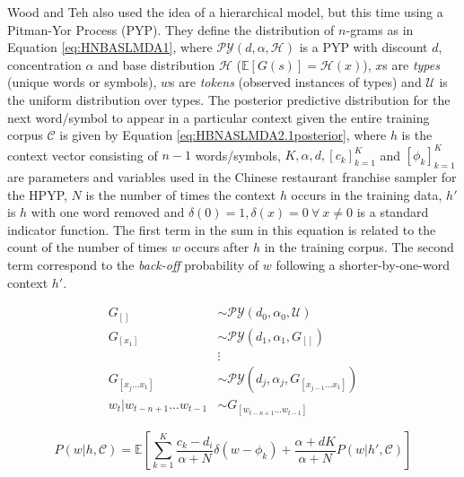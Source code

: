 Wood and Teh \cite{wood2008hierarchical} \cite{wood2009hierarchical} also used the idea of a hierarchical model, but this time using a Pitman-Yor Process (PYP). They define the distribution of $n$-grams as in Equation \ref{eq:HNBASLMDA1}, where $\mathcal{PY}(d,\alpha,\mathcal{H})$ is a PYP with discount $d$, concentration $\alpha$ and base distribution $\mathcal{H}$ ($\mathbb{E}[G(s)]=\mathcal{H}(x)$), $x$s are \textit{types} (unique words or symbols), $w$s are \textit{tokens} (observed instances of types) and $\mathcal{U}$ is the uniform distribution over types. The posterior predictive distribution for the next word/symbol to appear in a particular context given the entire training corpus $\mathcal{C}$ is given by Equation \ref{eq:HBNASLMDA2.1posterior}, where $h$ is the context vector consisting of $n-1$ words/symbols, $K,\alpha,d,[c_{k}]_{k=1}^{K}$ and $[\phi_{k}]_{k=1}^{K}$ are parameters and variables used in the Chinese restaurant franchise sampler for the HPYP, $N$ is the number of times the context $h$ occurs in the training data, $h'$ is $h$ with one word removed and $\delta(0)=1,\delta(x)=0\ \forall\ x\neq0$ is a standard indicator function. The first term in the sum in this equation is related to the count of the number of times $w$ occurs after $h$ in the training corpus. The second term correspond to the \textit{back-off} probability of $w$ following a shorter-by-one-word context $h'$.

\begin{subequations}
\begin{align}
G_{[]}&\sim\mathcal{PY}(d_{0},\alpha_{0},\mathcal{U})
\\
G_{[x_{1}]}&\sim\mathcal{PY}(d_{1},\alpha_{1},G_{[]})
\\
&\vdots\nonumber
\\
G_{[x_{j}...x_{1}]}&\sim\mathcal{PY}(d_{j},\alpha_{j},G_{[x_{j-1}...x_{1}]})
\\
w_{t}|w_{t-n+1}...w_{t-1}&\sim G_{[w_{t-n+1}...w_{t-1}]}
\end{align}
\label{eq:HNBASLMDA1}
\end{subequations}

\begin{equation}
P(w|h,\mathcal{C})=\mathbb{E}\left[\sum_{k=1}^{K}\frac{c_{k}-d_{i}}{\alpha+N}\delta(w-\phi_{k})+\frac{\alpha+dK}{\alpha+N}P(w|h',\mathcal{C})\right]
\label{eq:HBNASLMDA2.1posterior}
\end{equation}

